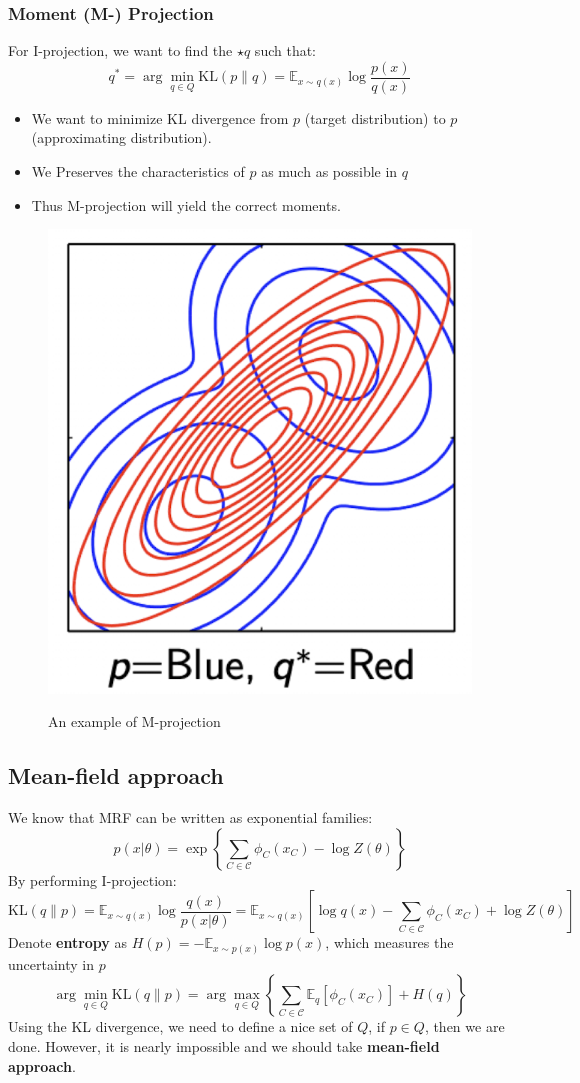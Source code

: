 \subsubsection*{Moment (M-) Projection}
For I-projection, we want to find the $\star{q}$ such that:
$$q^*=\arg \min _{q \in Q} \mathrm{KL}(p \| q)=\mathbb{E}_{x \sim q(x)} \log \frac{p(x)}{q(x)}$$
\begin{itemize}
    \item We want to minimize KL divergence from $p$ (target distribution) to $p$ (approximating distribution).
    \item We Preserves the characteristics of $p$ as much as possible in $q$
    \item Thus M-projection will yield the correct moments.
\end{itemize}
\begin{figure}[H]
    \centering
    \caption{An example of M-projection}
    \includegraphics[width = .3\linewidth]{figures/section8/figure_8_5.png}
    \label{fig:M-projection}
\end{figure}

\subsection{Mean-field approach}
We know that MRF can be written as exponential families:
$$
p(x | \theta)=\exp \left\{\sum_{C \in \mathcal{C}} \phi_C\left(x_C\right)-\log Z(\theta)\right\}
$$
By performing I-projection:
$$\mathrm{KL}(q \| p)=\mathbb{E}_{x \sim q(x)} \log \frac{q(x)}{p(x | \theta)}=\mathbb{E}_{x \sim q(x)}\left[\log q(x)-\sum_{C \in \mathcal{C}} \phi_C\left(x_C\right)+\log Z(\theta)\right]$$
Denote \textbf{entropy} as $H(p)=-\mathbb{E}_{x \sim p(x)} \log p(x)$, which measures the uncertainty in $p$
$$\arg \min _{q \in Q} \mathrm{KL}(q \| p)=\arg \max _{q \in Q}\left\{\sum_{C \in \mathcal{C}} \mathbb{E}_q\left[\phi_C\left(x_C\right)\right]+H(q)\right\}$$
Using the KL divergence, we need to define a nice set of $Q$, if $p\in Q$, then we are done. However, it is nearly impossible and we should take \textbf{mean-field approach}.\\

